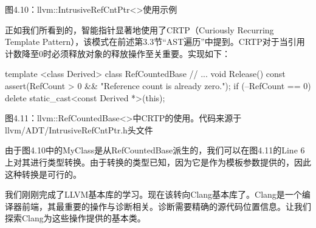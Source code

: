 \begin{center}
图4.10：llvm::IntrusiveRefCntPtr<>使用示例
\end{center}

正如我们所看到的，智能指针显著地使用了CRTP（Curiously Recurring Template Pattern），该模式在前述第3.3节“AST遍历”中提到。CRTP对于当引用计数降至0时必须释放对象的释放操作至关重要。实现如下：

\begin{cpp}
template <class Derived> class RefCountedBase {
  // ...
  void Release() const {
    assert(RefCount > 0 && "Reference count is already zero.");
    if (--RefCount == 0)
      delete static_cast<const Derived *>(this);
  }
}
\end{cpp}

\begin{center}
图4.11：llvm::RefCountedBase<>中CRTP的使用。代码来源于llvm/ADT/IntrusiveRefCntPtr.h头文件
\end{center}

由于图4.10中的MyClass是从RefCountedBase派生的，我们可以在图4.11的Line 6上对其进行类型转换。由于转换的类型已知，因为它是作为模板参数提供的，因此这种转换是可行的。

我们刚刚完成了LLVM基本库的学习。现在该转向Clang基本库了。Clang是一个编译器前端，其最重要的操作与诊断相关。诊断需要精确的源代码位置信息。让我们探索Clang为这些操作提供的基本类。


















































































